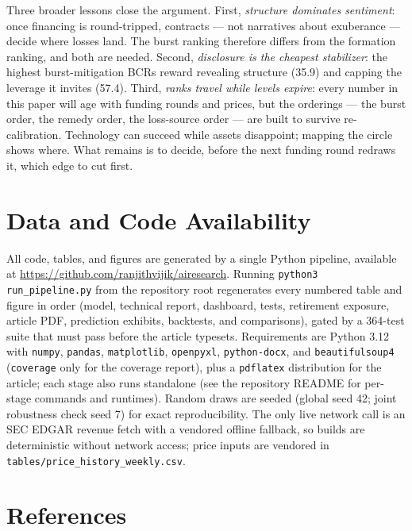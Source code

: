 \documentclass[11pt,a4paper]{article}
\begin{document}
Three broader lessons close the argument. First, \emph{structure dominates
sentiment}: once financing is round-tripped, contracts --- not narratives
about exuberance --- decide where losses land. The burst ranking therefore
differs from the formation ranking, and both are needed. Second,
\emph{disclosure is the cheapest stabilizer}: the highest burst-mitigation
BCRs reward revealing structure (35.9) and capping the leverage it invites
(57.4). Third, \emph{ranks travel while levels expire}: every number in
this paper will age with funding rounds and prices, but the orderings ---
the burst order, the remedy order, the loss-source order --- are built to
survive re-calibration. Technology can succeed while assets disappoint;
mapping the circle shows where. What remains is to decide, before the next
funding round redraws it, which edge to cut first.


\section*{Data and Code Availability}
All code, tables, and figures are generated by a single Python pipeline,
available at \url{https://github.com/ranjithvijik/airesearch}. Running
\texttt{python3 run\_pipeline.py} from the repository root regenerates every
numbered table and figure in order (model, technical report, dashboard,
tests, retirement exposure, article PDF, prediction exhibits, backtests, and
comparisons), gated by a 364-test suite that must pass before the article
typesets. Requirements are Python 3.12 with \texttt{numpy}, \texttt{pandas},
\texttt{matplotlib}, \texttt{openpyxl}, \texttt{python-docx},
and \texttt{beautifulsoup4} (\texttt{coverage} only for the
coverage report), plus a \texttt{pdflatex} distribution for the article;
each stage also runs standalone (see the repository README for per-stage
commands and runtimes). Random draws are seeded (global seed 42; joint
robustness check seed 7) for exact reproducibility. The only live network
call is an SEC EDGAR revenue fetch with a vendored offline fallback, so
builds are deterministic without network access; price inputs are vendored
in \texttt{tables/price\_history\_weekly.csv}.



\renewcommand{\refname}{}
\section*{References}
\label{sec:references}
\end{document}
